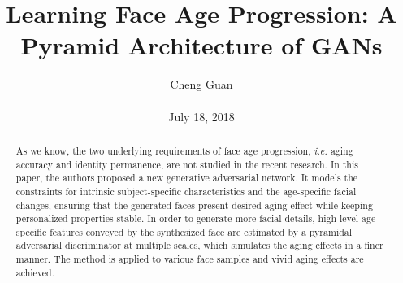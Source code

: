 \documentclass[10pt,twocolumn,letterpaper]{article}
\title{Learning Face Age Progression: A Pyramid Architecture of GANs}
\author{Cheng Guan\\\\
July 18, 2018}
\begin{document}
\maketitle
\begin{abstract}
As we know, the two underlying requirements of face age
progression, \textit{i.e.} aging accuracy and 
identity permanence, are not studied in the recent 
research. In this paper, the authors proposed a new
generative adversarial network. It models the 
constraints for intrinsic subject-specific 
characteristics and the age-specific facial changes, 
ensuring that the generated faces present desired aging 
effect while keeping personalized properties stable. 
In order to generate more facial details, high-level 
age-specific features conveyed by the synthesized face 
are estimated by a pyramidal adversarial discriminator 
at multiple scales, which simulates the aging effects in a finer manner. The method is applied to various face samples and vivid aging effects are achieved. 
\end{abstract}
%
\end{document}
